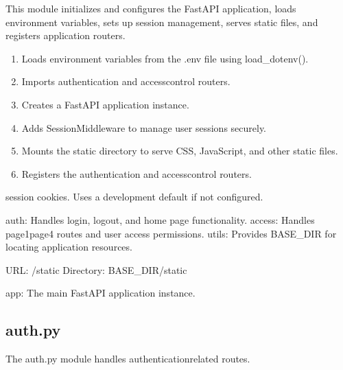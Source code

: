\documentclass[letterpaper,10pt,english]{sphinxmanual}
\begin{document}
\sphinxAtStartPar
This module initializes and configures the FastAPI application,
loads environment variables, sets up session management, serves
static files, and registers application routers.
\begin{description}
\begin{enumerate}
%
\item {} 
\sphinxAtStartPar
Loads environment variables from the .env file using load\_dotenv().

\item {} 
\sphinxAtStartPar
Imports authentication and access\sphinxhyphen{}control routers.

\item {} 
\sphinxAtStartPar
Creates a FastAPI application instance.

\item {} 
\sphinxAtStartPar
Adds SessionMiddleware to manage user sessions securely.

\item {} 
\sphinxAtStartPar
Mounts the static directory to serve CSS, JavaScript, and other
static files.

\item {} 
\sphinxAtStartPar
Registers the authentication and access\sphinxhyphen{}control routers.

\end{enumerate}

\begin{description}
\sphinxAtStartPar
session cookies. Uses a development default if not configured.

\end{description}

\sphinxAtStartPar
auth: Handles login, logout, and home page functionality.
access: Handles page1\sphinxhyphen{}page4 routes and user access permissions.
utils: Provides BASE\_DIR for locating application resources.

\sphinxAtStartPar
URL: /static
Directory: BASE\_DIR/static

\sphinxAtStartPar
app: The main FastAPI application instance.

\end{description}


\subsection{auth.py}
\label{\detokenize{modules:auth-py}}
\sphinxAtStartPar
The auth.py module handles authentication\sphinxhyphen{}related routes.
\end{document}
